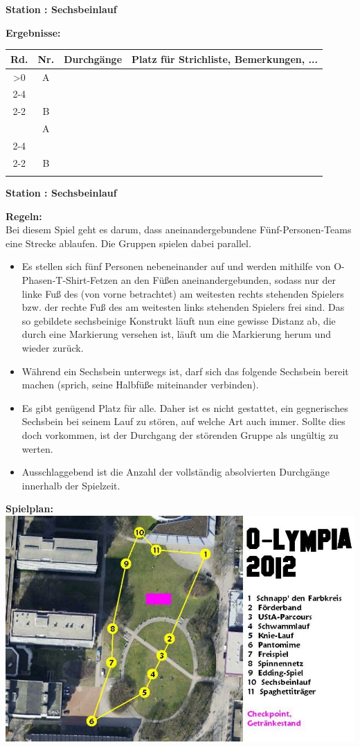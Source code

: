 \documentclass{scrartcl}
\newcommand{\replicate}[2]{\ifnum#1>0 #2
	\expandafter\replicate\expandafter{\number\numexpr#1-1}{#2}\fi}
\newcommand{\modulo}[2]{#1-((#1+#2)/#2-1)*#2}
\newcounter{station}\setcounter{station}{1}
\newcounter{ctrA}
\newcounter{ctrB}
\newcounter{currentRow}
\newcounter{noOfStations}\setcounter{noOfStations}{11}
\newenvironment{stationsheet}[3]
{\begin{center} \textbf{\huge Station \arabic{station}: #1}\\[2em]\end{center}
\textbf{\Large Ergebnisse:}\\[1em]
\setcounter{ctrA}{\value{station}}
\setcounter{ctrB}{\value{station}}
\setcounter{currentRow}{1}
\begin{tabular}{|c|c|p{3cm}|p{11cm}|}
\hline
\textbf{Rd.} & \textbf{Nr.} & \textbf{#2} & \textbf{Platz für Strichliste, Bemerkungen, ...}\\ \hline
\replicate{\value{noOfStations}}
{
\multirow{2}{*}{\arabic{currentRow}} & A\arabic{ctrA} & &
\ifthenelse{#3=0}{\\ \cline{2-4}}{\\ \cline{2-2}}
 & B\arabic{ctrB} & & \stepcounter{currentRow}
\setcounter{ctrA}{1+\modulo{\value{ctrA}-2}{\value{noOfStations}}}
\setcounter{ctrB}{1+\modulo{\value{ctrB}}{\value{noOfStations}}}
\\ \hline
}
\end{tabular}
\clearpage
\begin{center}\textbf{\huge Station \arabic{station}: #1}\end{center}
\textbf{\Large Regeln:}\\[1em]
}
{
\textbf{\Large Spielplan:}\\[1em]
\includegraphics[scale=0.57]{spielplan_11.png}
\addtocounter{station}{1}
\clearpage
}
\begin{document}
\begin{stationsheet}{Sechsbeinlauf}{Durchgänge}{0}
Bei diesem Spiel geht es darum, dass aneinandergebundene Fünf-Personen-Teams eine Strecke ablaufen. Die Gruppen spielen dabei parallel.
\begin{itemize}
\item Es stellen sich fünf Personen nebeneinander auf und werden mithilfe von O-Phasen-T-Shirt-Fetzen an den Füßen aneinandergebunden, sodass nur der linke Fuß des (von vorne betrachtet) am weitesten rechts stehenden Spielers bzw. der rechte Fuß des am weitesten links stehenden Spielers frei sind. Das so gebildete sechsbeinige Konstrukt läuft nun eine gewisse Distanz ab, die durch eine Markierung versehen ist, läuft um die Markierung herum und wieder zurück.
\item Während ein Sechsbein unterwegs ist, darf sich das folgende Sechsbein bereit machen (sprich, seine Halbfüße miteinander verbinden).
\item Es gibt genügend Platz für alle. Daher ist es nicht gestattet, ein gegnerisches Sechsbein bei seinem Lauf zu stören, auf welche Art auch immer. Sollte dies doch vorkommen, ist der Durchgang der störenden Gruppe als ungültig zu werten.
\item Ausschlaggebend ist die Anzahl der vollständig absolvierten Durchgänge innerhalb der Spielzeit.
\end{itemize}
\end{stationsheet}
\end{document}
